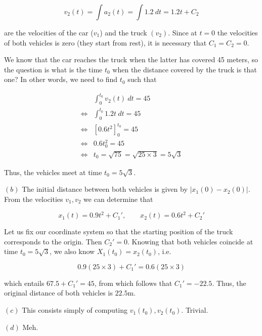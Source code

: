 \documentclass[12pt]{article}
\theoremstyle{definition}
\begin{document}
\begin{equation}
    v_2(t) = \int a_2(t) = \int 1.2 ~ dt = 1.2 t + C_2
\end{equation}


are the velocities of the car ($v_1$) and the truck $(v_2)$. Since at $t = 0$
the velocities of both vehicles is zero (they start from rest), it is necessary
that $C_1 = C_2 = 0$. 

We know that the car reaches the truck when the latter has covered 45 meters, so
the question is what is the time $t_0$ when the distance covered by the truck is
that one? In other words, we need to find $t_0$ such that 

\begin{align*}
&\int_0^{t_0} v_2(t) ~ dt = 45 \\ 
    \iff&\int_0^{t_0} 1.2t ~ dt = 45 \\ 
    \iff&\left[ 0.6t^2  \right]_0^{t_0} = 45 \\ 
    \iff&0.6 t_0^2  =45 \\ 
    \iff & t_0 = \sqrt{75}  = \sqrt{25 \times 3}  = 5\sqrt{3} 
\end{align*}

Thus, the vehicles meet at time $t_0 = 5\sqrt{3}  $.

$(b)$ The initial distance between both vehicles is given by $\left| x_1(0) -
x_2(0) \right| $. From the velocities $v_1, v_2$ we can determine that 

\begin{equation}
    x_1(t) = 0.9t^2 + C_1', \qquad x_2(t) = 0.6t^2 + C_2'
\end{equation}

Let us fix our coordinate system so that the starting position of the truck
corresponds to the origin. Then $C_2' = 0$. Knowing that both vehicles coincide
at time $t_0 = 5\sqrt{3} $, we also know $X_1(t_0) = x_2(t_0)$, i.e.

\begin{equation}
    0.9(25 \times 3) + C_1' = 0.6(25 \times 3) 
\end{equation}

which entails $67.5 + C_1' = 45$, from which follows  that $C_1' = -22.5$. Thus,
the original distance of both vehicles is $22.5$m.

$(c)$ This consists simply of computing $v_1(t_0), v_2(t_0)$. Trivial.

$(d)$ Meh. 

\pagebreak 
\end{document}
